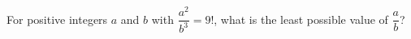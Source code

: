 For positive integers $a$ and $b$ with $\dfrac{a^2}{b^3}=9!$, what is the least possible value of $\dfrac{a}{b}$?
